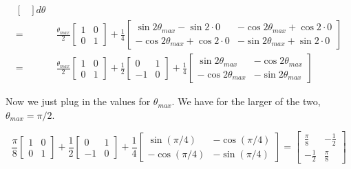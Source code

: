\documentclass[11pt,english]{article}
\begin{document}
\begin{enumerate}
\begin{align*}
\begin{bmatrix}
        \end{bmatrix} d\theta \\ 
    =&\; \frac{\theta_{max}}{2} 
        \begin{bmatrix}
            1 & 0 \\
            0 & 1
        \end{bmatrix} + \frac{1}{4} 
        \begin{bmatrix}
            \sin 2\theta_{max} - \sin 2 \cdot 0 & -\cos 2\theta_{max} + \cos 2\cdot 0 \\
            -\cos 2\theta_{max} + \cos 2\cdot 0 & -\sin 2\theta_{max} + \sin 2 \cdot 0
        \end{bmatrix} \\ 
    =&\; \frac{\theta_{max}}{2} 
        \begin{bmatrix}
            1 & 0 \\
            0 & 1
        \end{bmatrix} + \frac{1}{2} 
        \begin{bmatrix}
            0 & 1 \\
           -1 & 0
        \end{bmatrix} + \frac{1}{4} 
        \begin{bmatrix}
            \sin 2\theta_{max}  & -\cos 2\theta_{max}  \\
            -\cos 2\theta_{max} & -\sin 2\theta_{max} 
        \end{bmatrix}  
\end{align*}

Now we just plug in the values for $\theta_{max}$. We have for the larger of the two, 
$\theta_{max} = \pi/2$.

\[
\frac{\pi}{8} 
\begin{bmatrix}
    1 & 0 \\
    0 & 1
\end{bmatrix} + \frac{1}{2} 
\begin{bmatrix}
    0 & 1 \\
   -1 & 0
\end{bmatrix} + \frac{1}{4} 
\begin{bmatrix}
    \sin (\pi/4)  & -\cos (\pi/4) \\
    -\cos (\pi/4) & -\sin (\pi/4) 
\end{bmatrix} =  
\begin{bmatrix}
    \frac{\pi}{8} & -\frac{1}{2} \\
    -\frac{1}{2} & \frac{\pi}{8}
\end{bmatrix}  
\]


\end{enumerate}
\end{document}

